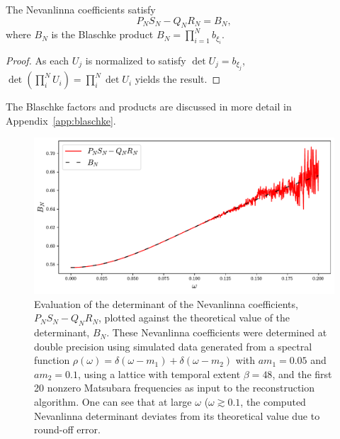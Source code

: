 \begin{theorem}
    The Nevanlinna coefficients satisfy
    \begin{equation}
        P_N S_N - Q_N R_N = B_N,
        \label{eq:nevalinna_determinant}
    \end{equation}
    where $B_N$ is the Blaschke product $B_N = \prod_{i = 1}^N b_{\xi_i}$. 
\end{theorem}

\begin{proof}
    As each $U_j$ is normalized to satisfy $\det U_j = b_{\xi_j}$, $\det(\prod_i^N U_i) = \prod_i^N \det U_i$ yields the result.
\end{proof}

The Blaschke factors and products are discussed in more detail in Appendix~\ref{app:blaschke}. 

\begin{figure}[!htp]
    \centering
    \includegraphics[width = \textwidth]{figs/det_identity_double_prec.pdf}
    \caption{Evaluation of the determinant of the Nevanlinna coefficients, $P_N S_N - Q_N R_N$, plotted against the theoretical value of the determinant, $B_N$. These Nevanlinna coefficients were determined at double precision using simulated data generated from a spectral function $\rho(\omega) = \delta(\omega - m_1) + \delta(\omega - m_2)$ with $am_1 = 0.05$ and $am_2 = 0.1$, using a lattice with temporal extent $\beta = 48$, and the first 20 nonzero Matsubara frequencies as input to the reconstruction algorithm. One can see that at large $\omega$ ($\omega \gtrsim 0.1$, the computed Nevanlinna determinant deviates from its theoretical value due to round-off error. }
    \label{fig:det_identity_double}
\end{figure}

